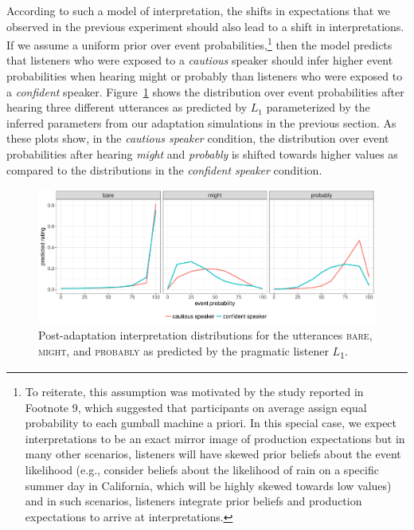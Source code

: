 \documentclass[man, floatsintext]{apa6}
\begin{document}
According to such a model of interpretation, the shifts in expectations that we observed in the previous experiment should also lead to a shift in interpretations. 
If we assume a uniform prior over event probabilities,\footnote{To reiterate, this assumption was motivated by the study reported in Footnote 9, which suggested that participants on average assign equal probability to each gumball machine a priori. In this special case, we expect interpretations to be an exact mirror image of production expectations but in many other scenarios, listeners will have skewed prior beliefs about the event likelihood (e.g., consider beliefs about the likelihood of rain on a specific summer day in California, which will be highly skewed towards low values) and in such scenarios, listeners integrate prior beliefs and  production expectations to arrive at interpretations.} then the model predicts that listeners who were exposed to a \textit{cautious} speaker should infer 
higher event probabilities when hearing {\sc might} or {\sc probably} than listeners who were exposed to a \textit{confident} speaker. Figure~\ref{fig:post-exposure-comp}
shows the distribution over event probabilities after hearing three different utterances as predicted by $L_1$ parameterized by the inferred parameters from our
adaptation simulations in the previous section. As these plots show, in the \textit{cautious speaker} condition, the distribution over event probabilities after hearing \textit{might} 
and \textit{probably} is shifted towards higher values as compared to the distributions in the \textit{confident speaker} condition. 

\begin{figure}
  \includegraphics[width=\textwidth]{plots/adaptation-posterior-comp.pdf}
  \caption{Post-adaptation interpretation distributions for the utterances  \textsc{bare}, \textsc{might}, and \textsc{probably} as predicted by the pragmatic listener $L$\textsubscript{$1$}. \label{fig:post-exposure-comp}}
\end{figure}
\end{document}
